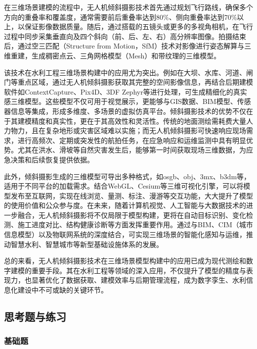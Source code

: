 在三维场景建模的流程中，无人机倾斜摄影技术首先通过规划飞行路线，确保多个方向的重叠率和覆盖度，通常需要前后重叠率达到80\%、侧向重叠率达到70\%以上，以保证影像数据质量。随后，通过搭载的五镜头或更多的多视角相机，在飞行过程中同步采集垂直向及四个斜向（前、后、左、右）高分辨率图像。拍摄结束后，通过空三匹配（Structure from Motion，SfM）技术对影像进行姿态解算与三维重建，生成稠密点云、三角网格模型（Mesh）和带纹理的三维模型。

该技术在水利工程三维场景构建中的应用尤为突出。例如在大坝、水库、河道、闸门等重点区域，通过无人机倾斜摄影获取其完整的空间影像信息，再结合后期建模软件如ContextCapture、Pix4D、3DF Zephyr等进行处理，可生成精细化的真实感三维模型。这些模型不仅可用于视觉展示，更能够与GIS数据、BIM模型、传感器信息等集成，形成多维度、多场景的虚拟仿真平台。倾斜摄影技术的优势不仅在于其建模精度和真实性，更在于其高效性和灵活性。传统的地面测绘需耗费大量人力物力，且在复杂地形或灾害区域难以实施；而无人机倾斜摄影可快速响应现场需求，进行高频次、定期或突发性的航拍任务，在应急响应和运维监测中具有明显优势。尤其在洪水、滑坡等自然灾害发生后，能够第一时间获取现场三维数据，为应急决策和后续恢复提供依据。

此外，倾斜摄影生成的三维模型可导出多种格式，如osgb、obj、3mx、b3dm等，适用于不同平台的加载需求。结合WebGL、Cesium等三维可视化引擎，可以将模型发布至互联网，实现在线浏览、量测、标注、漫游等交互功能，大大提升了模型的使用价值和公众参与度。在未来，随着计算机视觉、人工智能与大数据技术的进一步融合，无人机倾斜摄影将不仅局限于模型构建，更将在自动目标识别、变化检测、施工进度对比、结构健康诊断等方面发挥重要作用。通过与BIM、CIM（城市信息模型）以及物联网系统的深度结合，可实现三维场景的智能化感知与运维，推动智慧水利、智慧城市等新型基础设施体系的发展。

总的来看，无人机倾斜摄影技术在三维场景模型构建中的应用已成为现代测绘和数字建模的重要手段。其在水利工程等领域的深入应用，不仅提升了模型的精度与表现力，也显著优化了数据获取、建模效率与后期管理流程，成为数字孪生、水利信息化建设中不可或缺的关键环节。

\hypertarget{ux601dux8003ux9898ux4e0eux7ec3ux4e60-5}{%
\subsection{思考题与练习}\label{ux601dux8003ux9898ux4e0eux7ec3ux4e60-5}}

\hypertarget{ux57faux7840ux9898-5}{%
\subsubsection{基础题}\label{ux57faux7840ux9898-5}}

